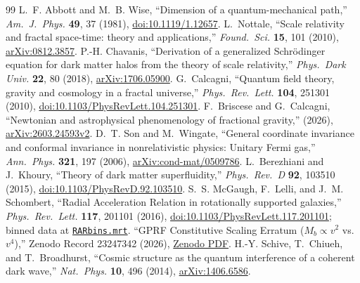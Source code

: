 \documentclass[11pt,letterpaper]{article}
\begin{document}
\begin{thebibliography}{99}\footnotesize
\setlength{\itemsep}{2pt}
 L.~F. Abbott and M.~B. Wise, ``Dimension of a quantum-mechanical path,'' \emph{Am.\ J.\ Phys.} \textbf{49}, 37 (1981), \href{https://pubs.aip.org/aapt/ajp/article/49/1/37/1051491/Dimension-of-a-quantum-mechanical-path}{doi:10.1119/1.12657}.
 L.~Nottale, ``Scale relativity and fractal space-time: theory and applications,'' \emph{Found.\ Sci.} \textbf{15}, 101 (2010), \href{https://arxiv.org/pdf/0812.3857}{arXiv:0812.3857}.
 P.-H. Chavanis, ``Derivation of a generalized Schr\"odinger equation for dark matter halos from the theory of scale relativity,'' \emph{Phys.\ Dark Univ.} \textbf{22}, 80 (2018), \href{https://arxiv.org/pdf/1706.05900}{arXiv:1706.05900}.
 G.~Calcagni, ``Quantum field theory, gravity and cosmology in a fractal universe,'' \emph{Phys.\ Rev.\ Lett.} \textbf{104}, 251301 (2010), \href{https://link.aps.org/doi/10.1103/PhysRevLett.104.251301}{doi:10.1103/PhysRevLett.104.251301}.
 F.~Briscese and G.~Calcagni, ``Newtonian and astrophysical phenomenology of fractional gravity,'' (2026), \href{https://arxiv.org/html/2603.24593v2}{arXiv:2603.24593v2}.
 D.~T. Son and M.~Wingate, ``General coordinate invariance and conformal invariance in nonrelativistic physics: Unitary Fermi gas,'' \emph{Ann.\ Phys.} \textbf{321}, 197 (2006), \href{https://arxiv.org/abs/cond-mat/0509786}{arXiv:cond-mat/0509786}.
 L.~Berezhiani and J.~Khoury, ``Theory of dark matter superfluidity,'' \emph{Phys.\ Rev.\ D} \textbf{92}, 103510 (2015), \href{https://link.aps.org/doi/10.1103/PhysRevD.92.103510}{doi:10.1103/PhysRevD.92.103510}.
 S.~S. McGaugh, F.~Lelli, and J.~M. Schombert, ``Radial Acceleration Relation in rotationally supported galaxies,'' \emph{Phys.\ Rev.\ Lett.} \textbf{117}, 201101 (2016), \href{https://link.aps.org/doi/10.1103/PhysRevLett.117.201101}{doi:10.1103/PhysRevLett.117.201101}; binned data at \href{https://astroweb.cwru.edu/SPARC/RARbins.mrt}{\texttt{RARbins.mrt}}.
 ``GPRF Constitutive Scaling Erratum ($M_b \propto v^2$ vs.\ $v^4$),'' Zenodo Record 23247342 (2026), \href{https://zenodo.org/records/23247342/files/GPRF_Erratum_v1.0.14_20261008.pdf?download=1}{Zenodo PDF}.
 H.-Y. Schive, T.~Chiueh, and T.~Broadhurst, ``Cosmic structure as the quantum interference of a coherent dark wave,'' \emph{Nat.\ Phys.} \textbf{10}, 496 (2014), \href{https://arxiv.org/abs/1406.6586}{arXiv:1406.6586}.

\end{thebibliography}
\end{document}

